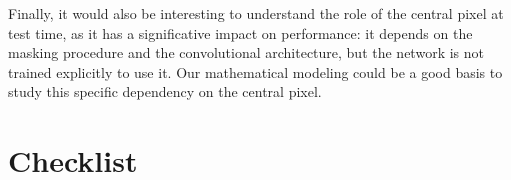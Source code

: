 \documentclass{article}
\begin{document}
Finally, it would also be interesting to understand the role of the central pixel at test time, as it has a significative impact on performance: it depends on the  masking procedure and the convolutional architecture, but the network is not trained explicitly to use it. Our mathematical modeling could be a good basis to study this specific dependency on the central pixel.

\FloatBarrier
\pagebreak



%


\section*{Checklist}
\end{document}
